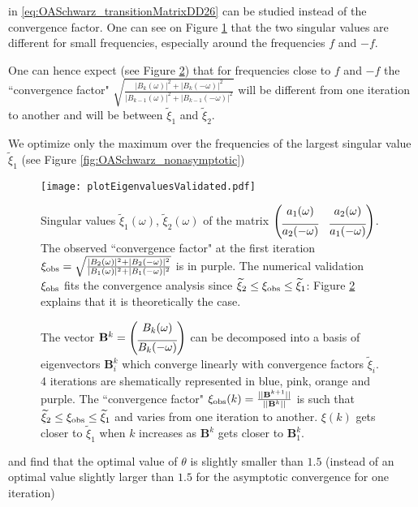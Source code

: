 in \eqref{eq:OASchwarz_transitionMatrixDD26}
can be studied instead of the convergence factor.
One can see on Figure \ref{fig:OASchwarz_singularValues} that
the two singular values are different for small frequencies,
especially around the frequencies $f$ and $-f$.
\par
One can hence expect (see
Figure \ref{fig:OASchwarz_rateBetweenEigenvalues}) that for frequencies close to $f$ and $-f$
the ``convergence factor"
$\sqrt{\frac{|B_k(\omega)|^2 +
|B_k(-\omega)|^2}{|B_{k-1}(\omega)|^2 + |B_{k-1}(-\omega)|^2}}$
will be different from one iteration to another and will
be between $\widetilde{\xi}_1$ and $\widetilde{\xi}_2$.
\par
We optimize only the maximum over the frequencies of the largest
singular value $\widetilde{\xi}_1$ (see Figure
\ref{fig:OASchwarz_nonasymptotic})
\begin{figure}
    \centering
    \texttt{[image: plotEigenvaluesValidated.pdf]}
	\caption{Singular values $\widetilde{\xi}_1(\omega)$,
	$\widetilde{\xi}_2(\omega)$ of the matrix $\begin{pmatrix}
	a_1(\omega) & a_2(\omega) \vspace{0.15cm}\\
	\overline{a_2(-\omega)} & \overline{a_1(-\omega)} \\
	\end{pmatrix}$.
	The observed ``convergence factor" at the first
	iteration ${\xi}_{\rm obs} = \sqrt{\frac{|B_2(\omega)|^2 +
	|B_2(-\omega)|^2}{|B_{1}(\omega)|^2
	+ |B_{1}(-\omega)|^2}}$
	is in purple. The numerical validation ${\xi}_{\rm obs}$ fits the
	convergence analysis since
	$\widetilde{\xi}_2 \leq {\xi}_{\rm obs} \leq\widetilde{\xi}_1$:
	Figure \ref{fig:OASchwarz_rateBetweenEigenvalues} explains
	that it is theoretically the case.
	}
    \label{fig:OASchwarz_singularValues}
\end{figure}
\begin{figure}
	\centering
	\caption[The convergence factor $\xi(k)$ varies and is bounded]{
	The vector
	$\mathbf{B}^k= \begin{pmatrix} B_k(\omega) \vspace{0.15cm}\\
	\overline{B_k(-\omega)} \end{pmatrix}$
	can be decomposed into a basis\footnotemark
	of eigenvectors
	$\mathbf{B}_i^k$ which converge linearly with
	convergence factors $\widetilde{\xi}_i$.
	4 iterations are shematically represented in blue, pink,
	orange and purple. The ``convergence factor"
	$\xi_{\rm obs}(k)=\frac{||\mathbf{B}^{k+1}||}{||\mathbf{B}^{k}||}$
	is such that
	$\widetilde{\xi}_2 \leq \xi_{\rm obs} \leq \widetilde{\xi}_1$ and
	varies from one iteration to another. $\xi(k)$
	gets closer to $\widetilde{\xi}_1$ when $k$ increases as
	$\mathbf{B}^k$ gets closer to $\mathbf{B}^k_1$.
	}
	\label{fig:OASchwarz_rateBetweenEigenvalues}
\end{figure}
and find that the optimal value of $\theta$ is slightly smaller than
$1.5$ (instead of an optimal value slightly larger than $1.5$
for the asymptotic convergence for one iteration)
